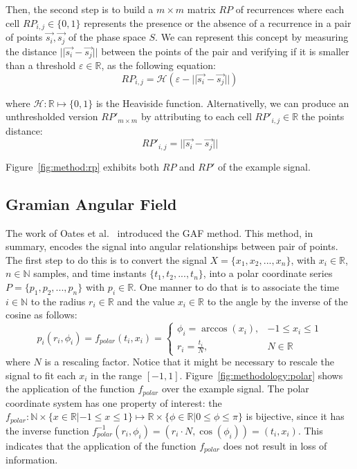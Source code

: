 

Then, the second step is to build a $m \times m$ matrix $RP$ of recurrences where each cell $RP_{i,j} \in \{0,1\}$ represents the presence or the absence of a recurrence in a pair of points $\vec{s_i},\vec{s_j}$ of the phase space $S$. We can represent this concept by measuring the distance $||\vec{s_i} - \vec{s_j}||$ between the points of the pair and verifying if it is smaller than a threshold $\varepsilon \in \mathbb{R}$, as the following equation:
\begin{equation}
    RP_{i,j} = \mathcal{H}(\varepsilon - ||\vec{s_i} - \vec{s_j}||)
\end{equation}

\noindent where $\mathcal{H}: \mathbb{R} \mapsto \{0,1\}$ is the Heaviside function. Alternativelly, we can produce an unthresholded version $RP'_{m \times m}$ by attributing to each cell $RP'_{i,j} \in \mathbb{R}$ the points distance:
\begin{equation}
    RP'_{i,j} = ||\vec{s_i} - \vec{s_j}||
\end{equation}  

\noindent Figure~\ref{fig:method:rp} exhibits both $RP$ and $RP'$ of the example signal.




\subsection{Gramian Angular Field}

The work of Oates et al.~\cite{gaf-mtf-1} introduced the \gls{GAF} method. This method, in summary, encodes the signal into angular relationships between pair of points. The first step to do this is to convert the signal $X=\{x_1,x_2,...,x_n\}$, with $x_i \in \mathbb{R}$, $n \in \mathbb{N}$ samples, and time instants $\{t_1,t_2,...,t_n\}$, into a polar coordinate series $P=\{p_1,p_2,...,p_n\}$ with $p_i \in \mathbb{R}$. One manner to do that is to associate the time $i \in \mathbb{N}$ to the radius $r_i \in \mathbb{R}$ and the value $x_i \in \mathbb{R}$ to the angle by the inverse of the cosine as follows:
\begin{equation}
    p_i(r_i, \phi_i) = f_{polar}(t_i, x_i) = 
    \begin{cases} 
        \phi_i = \arccos(x_i), & -1 \leq x_i \leq 1\\
        r_i = \frac{t_i}{N},     & N \in \mathbb{R}
    \end{cases}
\end{equation}
\noindent where $N$ is a rescaling factor. Notice that it might be necessary to rescale the signal to fit each $x_i$ in the range $[-1,1]$. Figure~\ref{fig:methodology:polar} shows the application of the function $f_{polar}$ over the example signal. The polar coordinate system has one property of interest: the $f_{polar}: \mathbb{N} \times \{x \in \mathbb{R}| -1 \leq x \leq 1\} \mapsto \mathbb{R} \times \{\phi \in \mathbb{R}| 0 \leq \phi \leq \pi \}$ is bijective, since it has the inverse function $f_{polar}^{-1}(r_i, \phi_i)=(r_i \cdot N, \cos(\phi_i))=(t_i,x_i)$. This indicates that the application of the function $f_{polar}$ does not result in loss of information.

